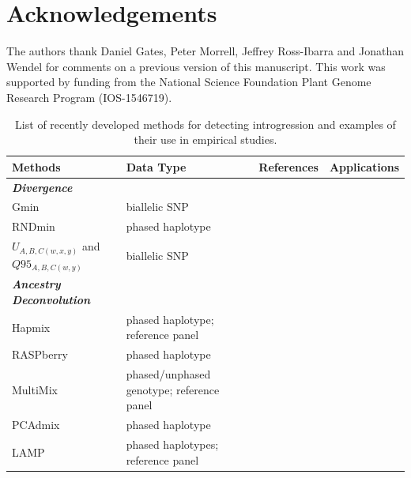 \documentclass[11pt]{article}
\begin{document}
\section*{Acknowledgements}
The authors thank Daniel Gates, Peter Morrell, Jeffrey Ross-Ibarra and Jonathan Wendel for comments on a previous version of this manuscript. This work was supported by funding from the National Science Foundation Plant Genome Research Program (IOS-1546719).




\nolinenumbers

\begin{table}[h]
\small
{}
\begin{center}
\caption{List of recently developed methods for detecting introgression and examples of their use in empirical studies.} \label{tab:tools}
\begin{tabular}{G{2.8cm}G{3.5cm}G{4cm}G{4cm}}
\\\toprule  
{}
{\bf Methods}	& {\bf Data Type } &	{\bf References} &  {\bf Applications } \\ \midrule

{\emph{\bf Divergence}} &   &   &   \\
Gmin &	biallelic SNP	&  \cite{geneva2015}	 &  \cite{kingan2015}\\
RNDmin	& phased haplotype	& \cite{rosenzweig2016} &  \cite{roda2017} \\
$U_{A,B,C(w,x,y)}$ and $Q95_{A,B,C(w,y)}$ & biallelic SNP & \cite{Racimo2015} & \cite{sams2016} \\

{\emph{\bf Ancestry Deconvolution}} &   &   &   \\
Hapmix	& phased haplotype; reference panel		& \cite{Price2009}	&  \cite{Hufford2013} \\ 
RASPberry &	phased haplotype &	\cite{wegmann2011}	 & \cite{christe2016} \\
MultiMix & phased/unphased genotype; reference panel &	\cite{churchhouse2013} &	\cite{eyheramendy2015} \\
PCAdmix	 & phased haplotype	 & \cite{brisbin2012pcadmix}	 &  \cite{moreno2014genetics} \\
LAMP  &	phased haplotypes; reference panel	 & \cite{sankararaman2008}	 & \cite{patterson2012} \\


\end{tabular}
\end{center}
\end{table}
\end{document}
